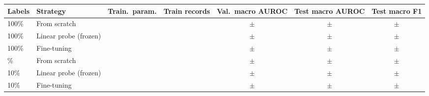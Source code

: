 \begin{tabular}{llrrccc}
\toprule
Labels & Strategy & Train.\ param. & Train records & Val.\ macro AUROC & Test macro AUROC & Test macro F1 \\
\midrule
100\% & From scratch & \transferParamsScratchFOneZeroZero{} & \transferNTrainScratchFOneZeroZero{} & \transferValAurocMeanScratchFOneZeroZero{} $\pm$ \transferValAurocSdScratchFOneZeroZero{} & \transferTestAurocMeanScratchFOneZeroZero{} $\pm$ \transferTestAurocSdScratchFOneZeroZero{} & \transferTestFOneMeanScratchFOneZeroZero{} $\pm$ \transferTestFOneSdScratchFOneZeroZero{} \\
100\% & Linear probe (frozen) & \transferParamsProbeFOneZeroZero{} & \transferNTrainProbeFOneZeroZero{} & \transferValAurocMeanProbeFOneZeroZero{} $\pm$ \transferValAurocSdProbeFOneZeroZero{} & \transferTestAurocMeanProbeFOneZeroZero{} $\pm$ \transferTestAurocSdProbeFOneZeroZero{} & \transferTestFOneMeanProbeFOneZeroZero{} $\pm$ \transferTestFOneSdProbeFOneZeroZero{} \\
100\% & Fine-tuning & \transferParamsFinetuneFOneZeroZero{} & \transferNTrainFinetuneFOneZeroZero{} & \transferValAurocMeanFinetuneFOneZeroZero{} $\pm$ \transferValAurocSdFinetuneFOneZeroZero{} & \transferTestAurocMeanFinetuneFOneZeroZero{} $\pm$ \transferTestAurocSdFinetuneFOneZeroZero{} & \transferTestFOneMeanFinetuneFOneZeroZero{} $\pm$ \transferTestFOneSdFinetuneFOneZeroZero{} \\
\addlinespace
10\% & From scratch & \transferParamsScratchFOneZero{} & \transferNTrainScratchFOneZero{} & \transferValAurocMeanScratchFOneZero{} $\pm$ \transferValAurocSdScratchFOneZero{} & \transferTestAurocMeanScratchFOneZero{} $\pm$ \transferTestAurocSdScratchFOneZero{} & \transferTestFOneMeanScratchFOneZero{} $\pm$ \transferTestFOneSdScratchFOneZero{} \\
10\% & Linear probe (frozen) & \transferParamsProbeFOneZero{} & \transferNTrainProbeFOneZero{} & \transferValAurocMeanProbeFOneZero{} $\pm$ \transferValAurocSdProbeFOneZero{} & \transferTestAurocMeanProbeFOneZero{} $\pm$ \transferTestAurocSdProbeFOneZero{} & \transferTestFOneMeanProbeFOneZero{} $\pm$ \transferTestFOneSdProbeFOneZero{} \\
10\% & Fine-tuning & \transferParamsFinetuneFOneZero{} & \transferNTrainFinetuneFOneZero{} & \transferValAurocMeanFinetuneFOneZero{} $\pm$ \transferValAurocSdFinetuneFOneZero{} & \transferTestAurocMeanFinetuneFOneZero{} $\pm$ \transferTestAurocSdFinetuneFOneZero{} & \transferTestFOneMeanFinetuneFOneZero{} $\pm$ \transferTestFOneSdFinetuneFOneZero{} \\
\bottomrule
\end{tabular}
